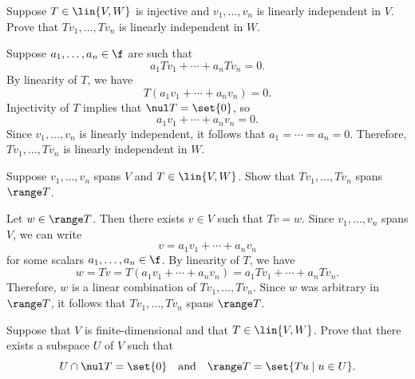 \begin{exercise}[3b9]
    Suppose $T \in \lin{V, W}$ is injective and $v_1, \ldots, v_n$ is linearly independent in $V$. Prove that $Tv_1, \ldots, Tv_n$ is linearly independent in $W$.
\end{exercise}

\begin{sol}
    Suppose $a_1, \ldots, a_n \in \f$ are such that
    \[a_1 Tv_1 + \cdots + a_n Tv_n = 0.\]
    By linearity of $T$, we have
    \[T(a_1 v_1 + \cdots + a_n v_n) = 0.\]
    Injectivity of $T$ implies that $\nul T = \set{0}$, so
    \[a_1 v_1 + \cdots + a_n v_n = 0.\]
    Since $v_1, \ldots, v_n$ is linearly independent, it follows that $a_1 = \cdots = a_n = 0$. Therefore, $Tv_1, \ldots, Tv_n$ is linearly independent in $W$.
\end{sol}

\begin{exercise}[3b10]
    Suppose $v_1, \ldots, v_n$ spans $V$ and $T \in \lin{V, W}$. Show that $Tv_1, \ldots, Tv_n$ spans $\range T$.
\end{exercise}

\begin{sol}
    Let $w \in \range T$. Then there exists $v \in V$ such that $Tv = w$. Since $v_1, \ldots, v_n$ spans $V$, we can write
    \[v = a_1 v_1 + \cdots + a_n v_n\]
    for some scalars $a_1, \ldots, a_n \in \f$. By linearity of $T$, we have
    \[w = Tv = T(a_1 v_1 + \cdots + a_n v_n) = a_1 Tv_1 + \cdots + a_n Tv_n.\]
    Therefore, $w$ is a linear combination of $Tv_1, \ldots, Tv_n$. Since $w$ was arbitrary in $\range T$, it follows that $Tv_1, \ldots, Tv_n$ spans $\range T$.
\end{sol}

\begin{exercise}[3b11]
    Suppose that $V$ is finite-dimensional and that $T \in \lin{V, W}$. Prove that there exists a subspace $U$ of $V$ such that
    \[U \cap \nul T = \set{0} \quad \text{and} \quad \range T = \set{Tu \mid u \in U}.\]
\end{exercise}

